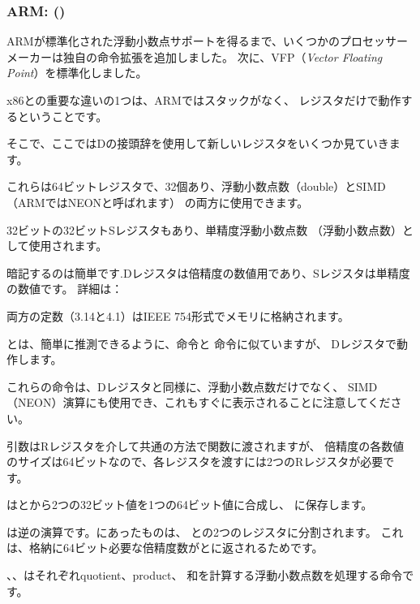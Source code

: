﻿\subsubsection{ARM: \OptimizingXcodeIV (\ARMMode)}

ARMが標準化された浮動小数点サポートを得るまで、いくつかのプロセッサーメーカーは独自の命令拡張を追加しました。 
次に、VFP（\emph{Vector Floating Point}）を標準化しました。

x86との重要な違いの1つは、ARMではスタックがなく、
レジスタだけで動作するということです。




そこで、ここではDの接頭辞を使用して新しいレジスタをいくつか見ていきます。

これらは64ビットレジスタで、32個あり、浮動小数点数（double）とSIMD（ARMではNEONと呼ばれます）
の両方に使用できます。

32ビットの32ビットSレジスタもあり、単精度浮動小数点数
（浮動小数点数）として使用されます。

暗記するのは簡単です.Dレジスタは倍精度の数値用であり、Sレジスタは単精度の数値です。
詳細は：

両方の定数（3.14と4.1）はIEEE 754形式でメモリに格納されます。

とは、簡単に推測できるように、命令と \MOV 命令に似ていますが、
Dレジスタで動作します。

これらの命令は、Dレジスタと同様に、浮動小数点数だけでなく、
SIMD（NEON）演算にも使用でき、これもすぐに表示されることに注意してください。

引数はRレジスタを介して共通の方法で関数に渡されますが、
倍精度の各数値のサイズは64ビットなので、各レジスタを渡すには2つのRレジスタが必要です。

はとから2つの32ビット値を1つの64ビット値に合成し、
に保存します。

は逆の演算です。にあったものは、
との2つのレジスタに分割されます。
これは、格納に64ビット必要な倍精度数がとに返されるためです。

、、はそれぞれ\gls{quotient}、\gls{product}、
和を計算する浮動小数点数を処理する命令です。


